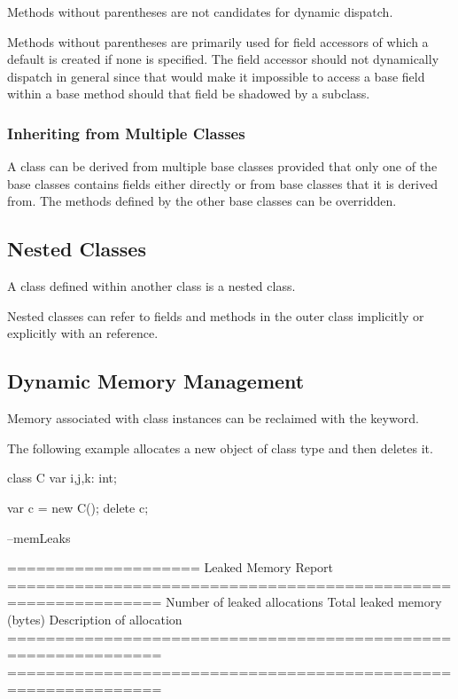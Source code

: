 Methods without parentheses are not candidates for dynamic dispatch.
\begin{rationale}
Methods without parentheses are primarily used for field accessors of
which a default is created if none is specified.  The field accessor
should not dynamically dispatch in general since that would make it
impossible to access a base field within a base method should that
field be shadowed by a subclass.
\end{rationale}

\subsubsection{Inheriting from Multiple Classes}
\label{Inheriting_from_Multiple_Classes}

A class can be derived from multiple base classes provided that only
one of the base classes contains fields either directly or from base
classes that it is derived from.  The methods defined by the other
base classes can be overridden.

\subsection{Nested Classes}
\label{Nested_Classes}

A class defined within another class is a nested class.

Nested classes can refer to fields and methods in the outer class
implicitly or explicitly with an  reference.

\subsection{Dynamic Memory Management}
\label{Dynamic_Memory_Management}

Memory associated with class instances can be reclaimed with the 
keyword.

\begin{example}
The following example allocates a new object  of class type 
and then deletes it.
\begin{chapelpre}
class C {
  var i,j,k: int;
}
\end{chapelpre}
\begin{chapel}
var c = new C();
delete c;
\end{chapel}
\begin{chapelpost}
\end{chapelpost}
\begin{chapelexecopts}
--memLeaks
\end{chapelexecopts}
\begin{chapeloutput}

====================
Leaked Memory Report
==============================================================
Number of leaked allocations
           Total leaked memory (bytes)
                      Description of allocation
==============================================================
==============================================================
\end{chapeloutput}
\end{example}

